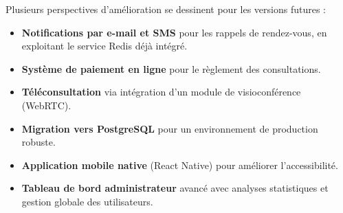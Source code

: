 \documentclass[12pt, a4paper]{article}
\begin{document}
Plusieurs perspectives d'amélioration se dessinent pour les versions futures :

\begin{itemize}[nosep]
  \item \textbf{Notifications par e-mail et SMS} pour les rappels de rendez-vous, en exploitant le service Redis déjà intégré.
  \item \textbf{Système de paiement en ligne} pour le règlement des consultations.
  \item \textbf{Téléconsultation} via intégration d'un module de visioconférence (WebRTC).
  \item \textbf{Migration vers PostgreSQL} pour un environnement de production robuste.
  \item \textbf{Application mobile native} (React Native) pour améliorer l'accessibilité.
  \item \textbf{Tableau de bord administrateur} avancé avec analyses statistiques et gestion globale des utilisateurs.
\end{itemize}

\end{document}
